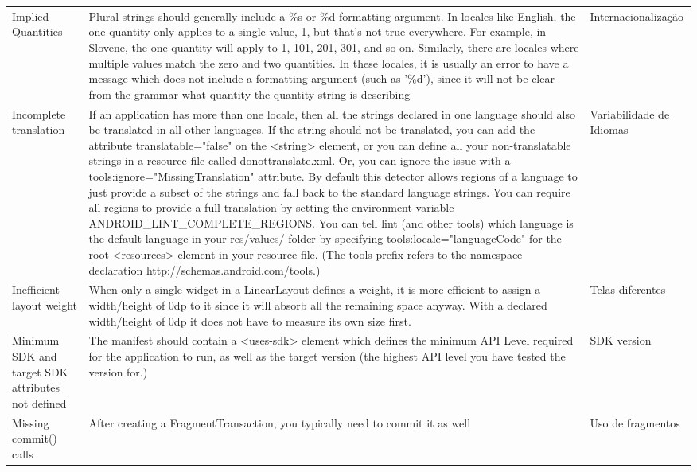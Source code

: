 \begin{landscape}
\begin{longtable}{p{30mm}|p{180mm}|p{25mm}}
Implied Quantities
&Plural strings should generally include a \%s or \%d formatting argument. In locales like English, the one quantity only applies to a single value, 1, but that's not true everywhere. For example, in Slovene, the one quantity will apply to 1, 101, 201, 301, and so on. Similarly, there are locales where multiple values match the zero and two quantities.
In these locales, it is usually an error to have a message which does not include a formatting argument (such as '\%d'), since it will not be clear from the grammar what quantity the quantity string is describing
&Internacionalização\\

Incomplete translation
&If an application has more than one locale, then all the strings declared in one language should also be translated in all other languages.  If the string should not be translated, you can add the attribute translatable="false" on the <string> element, or you can define all your non-translatable strings in a resource file called donottranslate.xml. Or, you can ignore the issue with a tools:ignore="MissingTranslation" attribute.  By default this detector allows regions of a language to just provide a subset of the strings and fall back to the standard language strings. You can require all regions to provide a full translation by setting the environment variable ANDROID\_LINT\_COMPLETE\_REGIONS.  You can tell lint (and other tools) which language is the default language in your res/values/ folder by specifying tools:locale="languageCode" for the root <resources> element in your resource file. (The tools prefix refers to the namespace declaration http://schemas.android.com/tools.)
&Variabilidade de Idiomas\\

Inefficient layout weight
&When only a single widget in a LinearLayout defines a weight, it is more efficient to assign a width/height of 0dp to it since it will absorb all the remaining space anyway. With a declared width/height of 0dp it does not have to measure its own size first.
&Telas diferentes\\

Minimum SDK and target SDK attributes not defined
&The manifest should contain a <uses-sdk> element which defines the minimum API Level required for the application to run, as well as the target version (the highest API level you have tested the version for.)
&SDK version\\

Missing commit() calls
&After creating a FragmentTransaction, you typically need to commit it as well
&Uso de fragmentos\\


\end{longtable}
\end{landscape}
